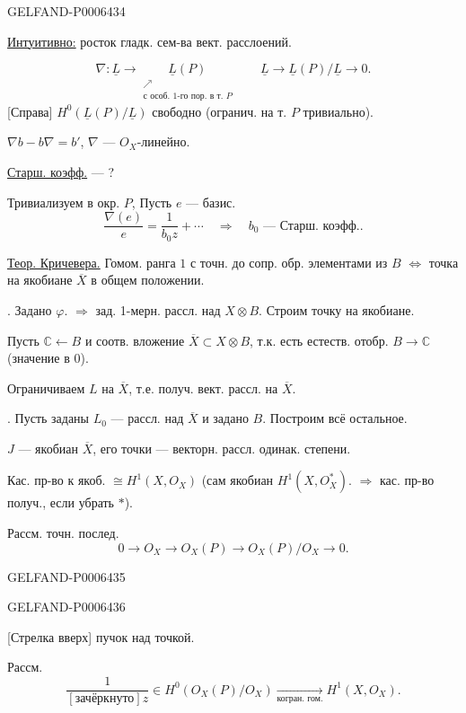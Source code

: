 \begin{GelfandAdjacentEvidence}{GELFAND-P000643}{4}


\underline{Интуитивно:} росток гладк. сем-ва вект. расслоений.

\[
\nabla:\underline L\longrightarrow
\underset{\substack{\nearrow\\\text{с особ. 1-го пор. в т. }P}}{\underline L(P)}
\qquad
\underline L\longrightarrow\underline L(P)/\underline L\longrightarrow0.
\]
[Справа] \(H^0(\underline L(P)/\underline L)\) свободно
(огранич. на т. \(P\) тривиально).

\(\nabla b-b\nabla=b'\), \(\nabla\) --- \(O_X\)-линейно.

\underline{Старш. коэфф.} --- ?

Тривиализуем в окр. \(P\), Пусть \(e\) --- базис.
\[
\frac{\nabla(e)}{e}=\frac{1}{b_0z}+\cdots
\quad\Rightarrow\quad b_0\text{ --- Старш. коэфф.}.
\]

\underline{Теор. Кричевера.}
Гомом. ранга \(1\) с точн. до сопр. обр. элементами из \(B\)
\(\Longleftrightarrow\) точка на якобиане \(\overline X\) в общем положении.

. Задано \(\varphi\). \(\Rightarrow\) зад. 1-мерн. рассл. над \(X\otimes B\).
Строим точку на якобиане.

Пусть \(\mathbb C\leftarrow B\) и соотв. вложение
\(\overline X\subset X\otimes B\), т.к. есть естеств. отобр. \(B\to\mathbb C\)
(значение в \(0\)).

Ограничиваем \(L\) на \(\overline X\), т.е. получ. вект. рассл. на \(\overline X\).

. Пусть заданы \(L_0\) --- рассл. над \(\overline X\) и задано \(B\).
Построим всё остальное.

\(J\) --- якобиан \(\overline X\), его точки --- векторн. рассл. одинак. степени.

Кас. пр-во к якоб. \(\cong H^1(X,O_X)\)
(сам якобиан \(H^1(X,O_X^*)\).
\(\Rightarrow\) кас. пр-во получ., если убрать \(*\)).

Рассм. точн. послед.
\[
0\longrightarrow O_X\longrightarrow O_X(P)
\longrightarrow O_X(P)/O_X\longrightarrow0.
\]
\end{GelfandAdjacentEvidence}
\begin{GelfandAdjacentEvidence}{GELFAND-P000643}{5}

\end{GelfandAdjacentEvidence}
\begin{GelfandAdjacentEvidence}{GELFAND-P000643}{6}

[Стрелка вверх] пучок над точкой.

Рассм.
\[
\frac{1}{[\text{зачёркнуто}]z}\in H^0(O_X(P)/O_X)
\xrightarrow[\text{когран. гом.}]{} H^1(X,O_X).
\]
\end{GelfandAdjacentEvidence}

